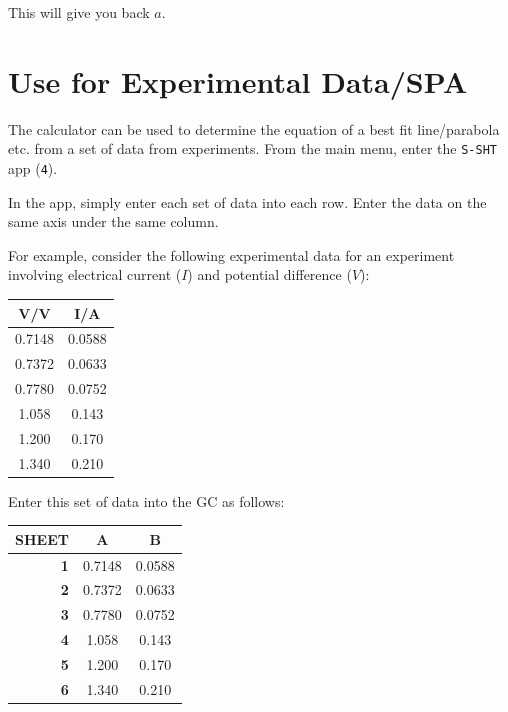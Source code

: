 \documentclass[a5paper]{memoir}
\def\code#1{\texttt{#1}}
\begin{document}
This will give you back $a$.

\section{Use for Experimental Data/SPA}
The calculator can be used to determine the equation of a best fit line/parabola etc. from a set of data from experiments. From the main menu, enter the \code{S-SHT} app (\code{4}). 

In the app, simply enter each set of data into each row. Enter the data on the same axis under the same column.

For example, consider the following experimental data for an experiment involving electrical current ($I$) and potential difference ($V$): 

\begin{center}
	\setlength{\tabcolsep}{10pt}
	\renewcommand{\arraystretch}{1.2}
	\begin{tabular}{|c|c|}
		\hline
		\textbf{V/V}	& \textbf{I/A} \\
		\hline
		0.7148			& 0.0588 \\
		\hline
		0.7372			& 0.0633 \\
		\hline
		0.7780			& 0.0752 \\
		\hline
		1.058			& 0.143 \\
		\hline
		1.200			& 0.170 \\
		\hline
		1.340			& 0.210 \\
		\hline
	\end{tabular}
\end{center}

Enter this set of data into the GC as follows:

\begin{center}
	\setlength{\tabcolsep}{10pt}
	\renewcommand{\arraystretch}{1.2}
	\begin{tabular}{|r|c|c|}
		\hline
		{\tiny SHEET}& \textbf{A}	& \textbf{B} \\
		\hline
		\textbf{1}	& 0.7148		& 0.0588 \\
		\hline
		\textbf{2}	& 0.7372		& 0.0633 \\
		\hline
		\textbf{3}	& 0.7780		& 0.0752 \\
		\hline
		\textbf{4}	& 1.058			& 0.143 \\
		\hline
		\textbf{5}	& 1.200			& 0.170 \\
		\hline
		\textbf{6}	& 1.340			& 0.210 \\
		\hline
	\end{tabular}
\end{center}
\end{document}
